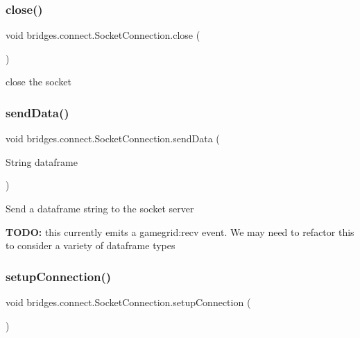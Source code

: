 \subsubsection{\texorpdfstring{close()}{close()}}
{\footnotesize\ttfamily void bridges.\+connect.\+Socket\+Connection.\+close (\begin{DoxyParamCaption}{ }\end{DoxyParamCaption})}



close the socket 

\mbox{\label{classbridges_1_1connect_1_1_socket_connection_a9f62a8dbff3debd6d226f9a0d59a4c33}} 
\subsubsection{\texorpdfstring{send\+Data()}{sendData()}}
{\footnotesize\ttfamily void bridges.\+connect.\+Socket\+Connection.\+send\+Data (\begin{DoxyParamCaption}\item[{String}]{dataframe }\end{DoxyParamCaption})}

Send a dataframe string to the socket server ~\newline


{\bfseries T\+O\+DO\+:} this currently emits a gamegrid\+:recv event. We may need to refactor this to consider a variety of dataframe types \mbox{\label{classbridges_1_1connect_1_1_socket_connection_ac5467b4da6cd41b0cee00be5b4cbc60d}} 
\subsubsection{\texorpdfstring{setup\+Connection()}{setupConnection()}}
{\footnotesize\ttfamily void bridges.\+connect.\+Socket\+Connection.\+setup\+Connection (\begin{DoxyParamCaption}{ }\end{DoxyParamCaption})}

